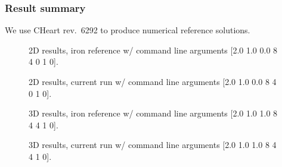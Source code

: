 \subsubsection{Result summary}
%
We use CHeart rev.\ 6292 to produce numerical reference solutions.
%


%
\begin{figure}[h!]
    \centering
    \caption{2D results, iron reference w/ command line arguments [2.0 1.0 0.0 8 4 0 1 0].}
    \label{example-0201-u-iron-2D-reference-fig}
\end{figure}
%
\begin{figure}[h!]
    \centering 
    \caption{2D results, current run w/ command line arguments [2.0 1.0 0.0 8 4 0 1 0].}
    \label{example-0201-u-current-run-2D-fig}
\end{figure}
%
\begin{figure}[h!]
    \centering 
    \caption{3D results, iron reference w/ command line arguments [2.0 1.0 1.0 8 4 4 1 0].}
    \label{example-0201-u-iron-3D-reference-fig}
\end{figure}
%
\begin{figure}[h!]
    \centering 
    \caption{3D results, current run w/ command line arguments [2.0 1.0 1.0 8 4 4 1 0].}
    \label{example-0201-u-current-run-3D-fig}
\end{figure}
%
